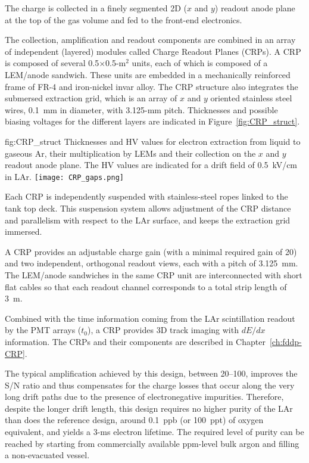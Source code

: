 The charge is collected in a finely segmented 2D ($x$ and $y$) readout anode
plane at the top of the gas volume and fed to the front-end electronics.   

The  collection, amplification and readout components are combined in an array of 
independent (layered) modules called Charge Readout Planes (CRPs). A CRP is 
composed of several 0.5$\times$0.5-m$^2$ units, each of which is composed 
of a LEM/anode sandwich. 
These units are embedded in a mechanically reinforced frame of FR-4 and iron-nickel invar alloy. The CRP structure also integrates
 the submersed extraction grid, which is an array of $x$ and $y$ oriented stainless steel wires, 0.1~mm in diameter, with 3.125-mm
pitch. Thicknesses and possible biasing voltages for the different layers are indicated in Figure~\ref{fig:CRP_struct}.
\begin{dunefigure}{fig:CRP_struct}
{Thicknesses and HV values for electron extraction from liquid to gaseous Ar, their  multiplication by LEMs and their collection on the $x$ and $y$ readout anode plane. The HV values are indicated for a drift field of 0.5~kV/cm in LAr.}
\texttt{[image: CRP\_gaps.png]}
\end{dunefigure}

Each CRP is independently suspended with stainless-steel ropes linked to the tank top deck. This suspension system allows adjustment of the CRP distance and parallelism with respect to the LAr surface, and keeps the extraction grid immersed.

A CRP provides an adjustable charge gain (with a minimal required gain of 20) and two independent, orthogonal readout views, each with a pitch of 3.125~mm.  The LEM/anode sandwiches  in the same CRP unit are interconnected with short flat cables so that each readout channel corresponds to a total strip length of 3~m.

Combined with the time information coming from the LAr scintillation readout by
the PMT arrays ($t_0$), a CRP provides 3D track imaging with $dE/dx$ information. 
The CRPs and their components are described in Chapter~\ref{ch:fddp-CRP}.

The typical amplification achieved by this design, between 20--100, improves the S/N ratio and thus 
compensates for the charge losses that occur along the very long drift paths due to the presence of 
electronegative impurities. Therefore, despite the longer drift length, this design requires no higher 
purity of the LAr than does the reference design, around 0.1~ppb (or 100~ppt) of oxygen equivalent,
and yields a 3-ms electron lifetime. The required level of purity can be reached by starting from 
commercially available ppm-level bulk argon and filling a non-evacuated vessel\cite{WA105_TDR}.

